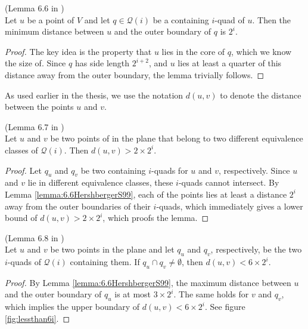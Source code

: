 \begin{Lemma} (Lemma 6.6 in \cite{HershbergerS99}) \label{lemma:6.6HershbergerS99}\\
Let $u$ be a point of $V$ and let $q \in \mathcal{Q}(i)$ be a containing $i$-quad of $u$. Then 
the minimum distance between $u$ and the outer boundary of $q$ is $2^i$.
\end{Lemma}

\begin{proof}
The key idea is the property that $u$ lies in the core of $q$, which we know the size of. Since 
$q$ has side length $2^{i+2}$, and $u$ lies at least a quarter of this distance away from the 
outer boundary, the lemma trivially follows.
\end{proof}

As used earlier in the thesis, we use the notation $d(u,v)$ to denote the distance between the 
points $u$ and $v$.

\begin{Lemma} (Lemma 6.7 in \cite{HershbergerS99}) \label{lemma:6.7HershbergerS99} \\
Let $u$ and $v$ be two points of in the plane that belong to two different equivalence classes of 
$\mathcal{Q}(i)$. Then $d(u,v) > 2 \times 2^i$.
\end{Lemma}

\begin{proof}
Let $q_u$ and $q_v$ be two containing $i$-quads for $u$ and $v$, respectively. Since $u$ and $v$ 
lie in different equivalence classes, these $i$-quads cannot intersect. By Lemma 
\ref{lemma:6.6HershbergerS99}, each of the points lies at least a distance $2^i$ away from 
the outer boundaries of their $i$-quads, which immediately gives a lower bound of $d(u,v) > 2 
\times 2^i$, which proofs the lemma.
\end{proof}

\begin{Lemma} (Lemma 6.8 in \cite{HershbergerS99}) \label{lemma:6.8HershbergerS99}\\
Let $u$ and $v$ be two points in the plane and let $q_u$ and $q_v$, respectively, be the two $i$-quads of $\mathcal{Q}(i)$ containing them. If $q_u \cap q_v \neq \emptyset$, then $d(u,v) < 6 
\times 2^i$.
\end{Lemma}

\begin{proof}
By Lemma \ref{lemma:6.6HershbergerS99}, the maximum distance between $u$ and the outer boundary 
of $q_u$ is at most $3 \times 2^i$. The same holds for $v$ and $q_v$, which implies the upper 
boundary of $d(u,v) < 6 \times 2^i$. See figure \ref{fig:lessthan6i}.
\end{proof}

